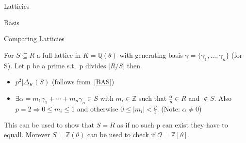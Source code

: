 \documentclass[12pt, letterpaper]{article}
\newcommand{\Q}{\mathbb{Q}}
\newcommand{\Z}{\mathbb{Z}}
\newcommand{\Ok}{\mathcal{O}}
\begin{document}
\begin{section}{Latticies}
\begin{subsection}{Basis}
  \end{subsection}

  \begin{subsection}{Comparing Latticies}

    For \(S \subseteq R\) a full lattice in \(K = \Q(\theta)\) with generating
    basis \(\gamma = \{ \gamma_{1}, \dots , \gamma_{n}\}\) (for S). Let p be a
    prime s.t.\ p divides \(| R / S |\) then
    \begin{itemize}
      \item \(p^{2} | \Delta_{K}(S)\) (follows from~\ref{BAS})
      \item \(\exists \alpha = m_{1} \gamma_{1} + \cdots + m_{n} \gamma_{n}
            \in S\) with \(m_{i} \in \Z\) such that \(\frac{\alpha}{p} \in R\)
            and \(\notin S\). Also \(p = 2 \Rightarrow 0 \leq m_{i} \leq 1\)
            and otherwise \(0 \leq | m_{i} | < \frac{p}{2}\). (Note: \(\alpha
            \neq 0\))
    \end{itemize}
    This can be used to show that \(S = R\) as if no such p can exist they have
    to equall. Morever \(S = \Z(\theta)\) can be used to check if
    \(\Ok = \Z[\theta]\).

  \end{subsection}

\end{section}
\end{document}
